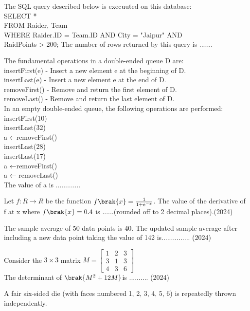     The SQL query described below is execuuted on this database:\\
    SELECT *\\
    FROM Raider, Team\\
    WHERE Raider.ID = Team.ID AND City = "Jaipur" AND \\
    RaidPoints > 200;
    The number of rows returned by this query is ....... 
    \item[32.] The fundamental operations in a double-ended queue D are:\\
    insertFirst(e) - Insert a new element e at the beginning of D.\\
    insertLast(e) - Insert a new element e at the end of D.\\
    removeFirst() - Remove and return the first element of D.\\
    removeLast() - Remove and return the last element of D.\\
    In an empty double-ended queue, the following operations are performed:\\
    insertFirst(10)\\
    insertLast(32)\\
    a ←removeFirst()\\
    insertLast(28)\\
    insertLast(17)\\
    a ←removeFirst()\\
    a ← removeLast()\\
    The value of a is .............
    \item Let $f:R\to R$ be the function $f\brak{x} = \frac{1}{1+e^{-x}}$. The value of the derivative of f at x where $f\brak{x} = 0.4$ is ......(rounded off to 2 decimal places).\hfill (2024)
    \item The sample average of 50 data points is 40. The updated sample average after
    including a new data point taking the value of 142 is............... \hfill (2024)
    \item Consider the $3\times 3$ matrix $M = \begin{bmatrix}1&2&3\\3&1&3\\4&3&6\end{bmatrix}$ \\ The determinant of $\brak{M^2 + 12M} $is .......... \hfill (2024)
    \item A fair six-sided die (with faces numbered 1, 2, 3, 4, 5, 6) is repeatedly thrown
    independently.\\
